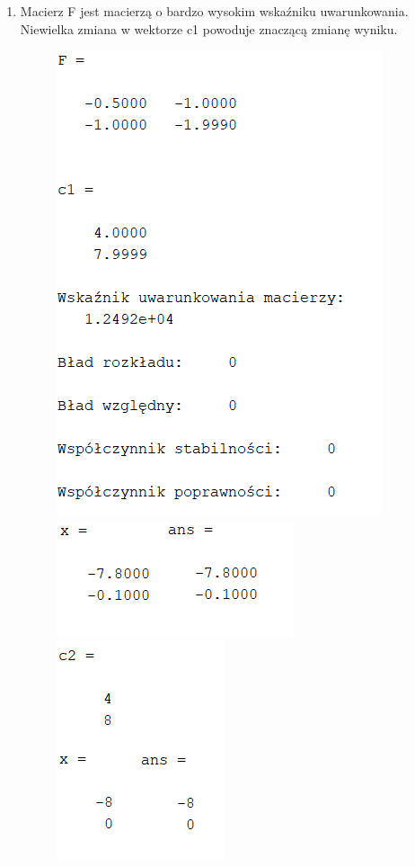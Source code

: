 \documentclass[11pt]{article}
\begin{document}
\begin{enumerate}
    \break

    \item Macierz F jest macierzą o bardzo wysokim wskaźniku uwarunkowania. Niewielka zmiana w wektorze c1 powoduje znaczącą zmianę wyniku.
    \begin{figure}[h]
        \centering
        \includegraphics[scale=0.8]{F1}
        \includegraphics[scale=0.9]{F2}\\
        \includegraphics[scale=0.8]{F3}
    \end{figure}


\end{enumerate}
\end{document}

